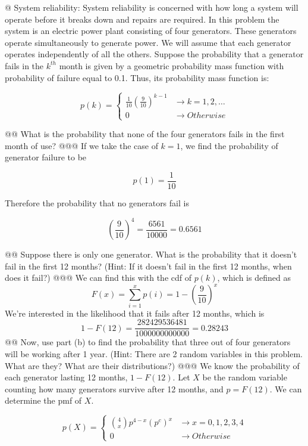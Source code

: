 \documentclass[10pt]{article}
\begin{document}
\begin{easylist}[enumerate]
    @ System reliability: System reliability is concerned with how long a system will operate before it breaks down and
    repairs are required. In this problem the system is an electric power plant consisting of four generators. These
    generators operate simultaneously to generate power. We will assume that each generator operates independently of
    all the others.  Suppose the probability that a generator fails in the $k^{th}$ month is given by a geometric
    probability mass function with probability of failure equal to 0.1. Thus, its probability mass function is:

        \[
            p(k) =
            \begin{cases}
                \frac{1}{10} {\left( \frac{9}{10} \right)}^{k - 1} &\to k = 1, 2, \ldots\\
                0 &\to Otherwise
            \end{cases}
        \]

    @@ What is the probability that none of the four generators fails in the first month of use?
    @@@ If we take the case of $k=1$, we find the probability of generator failure to be

        \[ p(1) = \frac{1}{10} \]

        Therefore the probability that no generators fail is

        \[ {\left( \frac{9}{10} \right)}^4 = \frac{6561}{10000} = \boxed{0.6561} \]

    @@ Suppose there is only one generator. What is the probability that it doesn't fail in the first 12 months? (Hint:
    If it doesn't fail in the first 12 months, when does it fail?)
    @@@ We can find this with the cdf of $p(k)$, which is defined as
        \[ F(x) = \sum_{i = 1}^{x} p(i) = 1 - {\left( \frac{9}{10} \right)}^x \]
        We're interested in the likelihood that it fails after 12 months, which is
        \[
            1 - F(12) = \frac{282429536481}{1000000000000} = \boxed{0.28243}
        \]
    @@ Now, use part (b) to find the probability that three out of four generators will be working after 1 year. (Hint:
    There are 2 random variables in this problem. What are they? What are their distributions?)
    @@@ We know the probability of each generator lasting 12 months, $1 - F(12)$. Let $X$ be the random variable
    counting how many generators survive after 12 months, and $p = F(12)$. We can determine the pmf of $X$.

        \[
            p(X) =
            \begin{cases}
                \binom{4}{x} p^{4 - x} {(p^c)}^{x} &\to x = {0, 1, 2, 3, 4}\\
                0 &\to Otherwise
            \end{cases}
        \]


\end{easylist}
\end{document}
